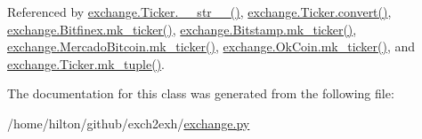 Referenced by \hyperlink{exchange_8py_source_l00111}{exchange.\+Ticker.\+\_\+\+\_\+str\+\_\+\+\_\+()}, \hyperlink{exchange_8py_source_l00065}{exchange.\+Ticker.\+convert()}, \hyperlink{exchange_8py_source_l00354}{exchange.\+Bitfinex.\+mk\+\_\+ticker()}, \hyperlink{exchange_8py_source_l00423}{exchange.\+Bitstamp.\+mk\+\_\+ticker()}, \hyperlink{exchange_8py_source_l00557}{exchange.\+Mercado\+Bitcoin.\+mk\+\_\+ticker()}, \hyperlink{exchange_8py_source_l00622}{exchange.\+Ok\+Coin.\+mk\+\_\+ticker()}, and \hyperlink{exchange_8py_source_l00096}{exchange.\+Ticker.\+mk\+\_\+tuple()}.



The documentation for this class was generated from the following file\+:\begin{DoxyCompactItemize}
\item 
/home/hilton/github/exch2exh/\hyperlink{exchange_8py}{exchange.\+py}\end{DoxyCompactItemize}
